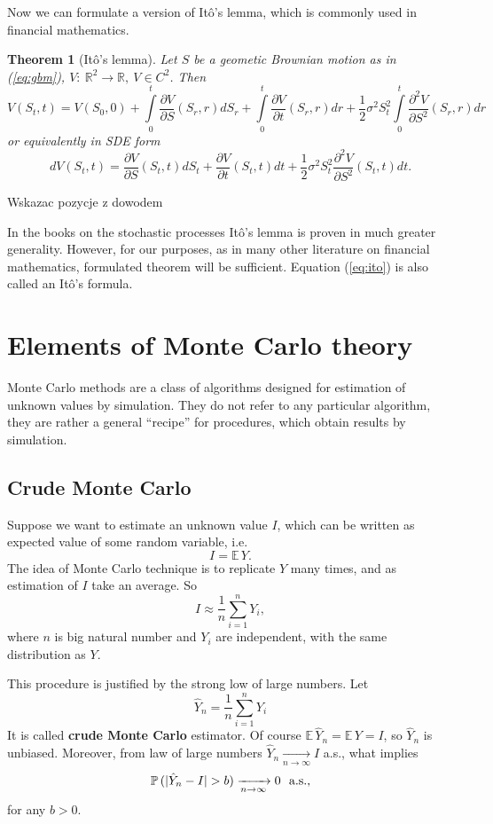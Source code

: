 \documentclass[a4paper,12pt, twoside]{book}
\newtheorem{thm}{Theorem}[section]
\theoremstyle{definition}
\theoremstyle{remark}
\def\E{{\mathbb{E}}\,}
\def\P{{\mathbb{P}}\,}
\def\R{{\mathbb{R}}}
\def\conv{\xrightarrow[n \rightarrow \infty]{}}
\begin{document}
\noindent Now we can formulate a version of It\^{o}'s lemma, which is commonly used in financial mathematics.
\begin{thm}[It\^{o}'s lemma]
  Let $S$ be a geometic Brownian motion as in (\ref{eq:gbm}), $V:\ \R^2 \rightarrow \R,\ V \in C^2$. Then 
  \begin{equation*}
   V(S_t, t) = V(S_0, 0) + \int\limits_0^t \frac{\partial V}{\partial S}(S_r,r)dS_r + \int\limits_0^t \frac{\partial V}{\partial t}(S_r,r)dr + \frac{1}{2}\sigma^2 S_t^2 \int\limits_0^t \frac{\partial^2 V}{\partial S^2}(S_r,r)dr
  \end{equation*}
  or equivalently in SDE form
  \begin{equation}
   \label{eq:ito}
   dV(S_t, t) = \frac{\partial V}{\partial S}(S_t,t)dS_t + \frac{\partial V}{\partial t}(S_t,t)dt + \frac{1}{2}\sigma^2 S_t^2 \frac{\partial^2 V}{\partial S^2}(S_t,t)dt   .
  \end{equation}  
\end{thm}
{\Large \color{red} Wskazac pozycje z dowodem}

\noindent In the books on the stochastic processes It\^{o}'s lemma is proven in much greater generality. However, for our purposes, as in many other literature on financial mathematics, formulated theorem will be sufficient. Equation (\ref{eq:ito}) is also called an It\^{o}'s formula.


\section{Elements of Monte Carlo theory}
Monte Carlo methods are a class of algorithms designed for estimation of unknown values by simulation. They do not refer to any particular algorithm, they are rather a general ``recipe'' for procedures, which obtain results by simulation.

\subsection{Crude Monte Carlo}
Suppose we want to estimate an unknown value $I$, which can be written as expected value of some random variable, i.e.
\[ I = \E Y. \]
The idea of Monte Carlo technique is to replicate $Y$ many times, and as estimation of $I$ take an average. So
\[ I \approx \frac{1}{n} \sum\limits_{i=1}^n Y_i, \]
where $n$ is big natural number and $Y_i$ are independent, with the same distribution as $Y$.

This procedure is justified by the strong low of large numbers. Let 
\begin{equation}
 \label{eq:CMC}
 \hat{Y}_n = \frac{1}{n}\sum\limits_{i=1}^n Y_i
\end{equation}
It is called \textbf{crude Monte Carlo} estimator. Of course $\E\hat{Y}_n = \E Y = I$, so $\hat{Y}_n$ is unbiased. Moreover, from law of large numbers $\hat{Y}_n \conv I$ a.s., what implies 
\[ \P(|\hat{Y}_n - I| > b) \conv 0 \hbox{\ \ a.s.,} \]
for any $b > 0$. 
\end{document}
